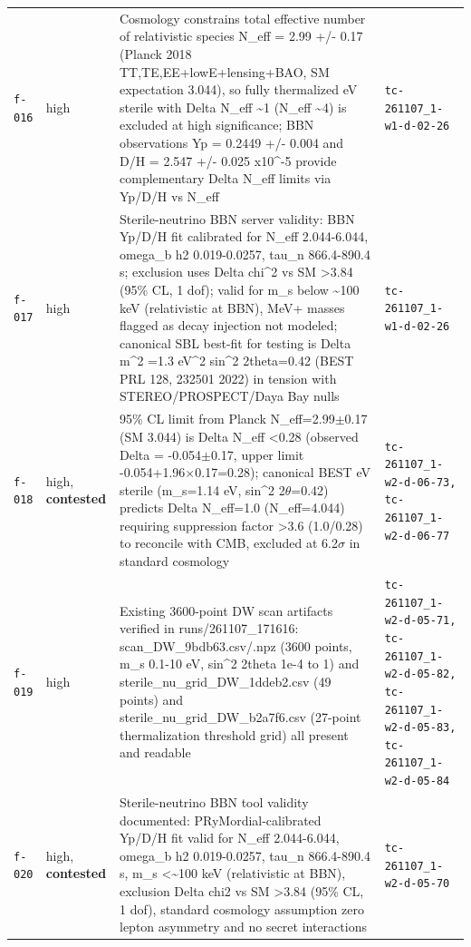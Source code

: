 \documentclass[11pt,a4paper]{article}
\begin{document}
\begin{longtable}{@{}p{}p{}p{}p{}@{}}
\texttt{f-016} & high & Cosmology constrains total effective number of relativistic species N\_eff = 2.99 +/- 0.17 (Planck 2018 TT,TE,EE+lowE+lensing+BAO, SM expectation 3.044), so fully thermalized eV sterile with Delta N\_eff \textasciitilde{}1 (N\_eff \textasciitilde{}4) is excluded at high significance; BBN observations Yp = 0.2449 +/- 0.004 and D/H = 2.547 +/- 0.025 x10\textasciicircum{}-5 provide complementary Delta N\_eff limits via Yp/D/H vs N\_eff & \texttt{tc-261107\_\allowbreak{}1-w1-d-02-26} \\
\texttt{f-017} & high & Sterile-neutrino BBN server validity: BBN Yp/D/H fit calibrated for N\_eff 2.044-6.044, omega\_b h2 0.019-0.0257, tau\_n 866.4-890.4 s; exclusion uses Delta chi\textasciicircum{}2 vs SM \textgreater{}3.84 (95\% CL, 1 dof); valid for m\_s below \textasciitilde{}100 keV (relativistic at BBN), MeV+ masses flagged as decay injection not modeled; canonical SBL best-fit for testing is Delta m\textasciicircum{}2 =1.3 eV\textasciicircum{}2 sin\textasciicircum{}2 2theta=0.42 (BEST PRL 128, 232501 2022) in tension with STEREO/PROSPECT/Daya Bay nulls & \texttt{tc-261107\_\allowbreak{}1-w1-d-02-26} \\
\texttt{f-018} & high, \textbf{contested} & 95\% CL limit from Planck N\_eff=2.99$\pm$0.17 (SM 3.044) is Delta N\_eff \textless{}0.28 (observed Delta = -0.054$\pm$0.17, upper limit -0.054+1.96$\times$0.17=0.28); canonical BEST eV sterile (m\_s=1.14 eV, sin\textasciicircum{}2 2$\theta$=0.42) predicts Delta N\_eff=1.0 (N\_eff=4.044) requiring suppression factor \textgreater{}3.6 (1.0/0.28) to reconcile with CMB, excluded at 6.2$\sigma$ in standard cosmology & \texttt{tc-261107\_\allowbreak{}1-w2-d-06-73,\allowbreak{} tc-261107\_\allowbreak{}1-w2-d-06-77} \\
\texttt{f-019} & high & Existing 3600-point DW scan artifacts verified in runs/261107\_171616: scan\_DW\_9bdb63.csv/.npz (3600 points, m\_s 0.1-10 eV, sin\textasciicircum{}2 2theta 1e-4 to 1) and sterile\_nu\_grid\_DW\_1ddeb2.csv (49 points) and sterile\_nu\_grid\_DW\_b2a7f6.csv (27-point thermalization threshold grid) all present and readable & \texttt{tc-261107\_\allowbreak{}1-w2-d-05-71,\allowbreak{} tc-261107\_\allowbreak{}1-w2-d-05-82,\allowbreak{} tc-261107\_\allowbreak{}1-w2-d-05-83,\allowbreak{} tc-261107\_\allowbreak{}1-w2-d-05-84} \\
\texttt{f-020} & high, \textbf{contested} & Sterile-neutrino BBN tool validity documented: PRyMordial-calibrated Yp/D/H fit valid for N\_eff 2.044-6.044, omega\_b h2 0.019-0.0257, tau\_n 866.4-890.4 s, m\_s \textless{}\textasciitilde{}100 keV (relativistic at BBN), exclusion Delta chi2 vs SM \textgreater{}3.84 (95\% CL, 1 dof), standard cosmology assumption zero lepton asymmetry and no secret interactions & \texttt{tc-261107\_\allowbreak{}1-w2-d-05-70} \\

\end{longtable}
\end{document}
